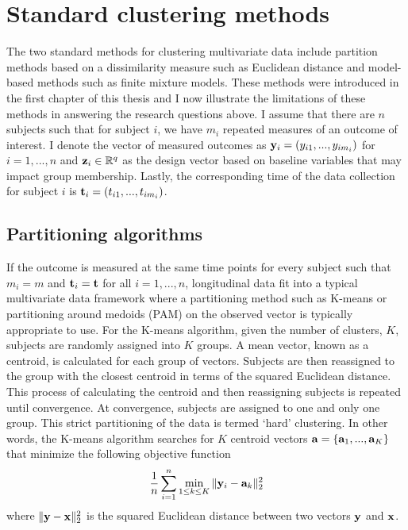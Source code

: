 \section{Standard clustering methods}
The two standard methods for clustering multivariate data include partition methods based on a dissimilarity measure such as Euclidean distance and model-based methods such as finite mixture models. These methods were introduced in the first chapter of this thesis and I now illustrate the limitations of these methods in answering the research questions above. I assume that there are $n$ subjects such that for subject $i$, we have $m_{i}$ repeated measures of an outcome of interest. I denote the vector of measured outcomes as $\mathbf y_{i}=(y_{i1},...,y_{im_{i}})$ for $i=1,...,n$ and $\mathbf z_{i}\in \mathbb{R}^{q}$ as the design vector based on baseline variables that may impact group membership. Lastly, the corresponding time of the data collection for subject $i$ is $\mathbf t_{i}=(t_{i1},...,t_{im_{i}})$. 
\subsection{Partitioning algorithms}
If the outcome is measured at the same time points for every subject such that $m_{i}=m$ and $\mathbf t_{i}=\mathbf t$ for all $i=1,...,n$, longitudinal data fit into a typical multivariate data framework where a partitioning method such as K-means \cite{macqueen1967, hartigan1979} or partitioning around medoids (PAM) \cite{kaufman1990} on the observed vector is typically appropriate to use. For the K-means algorithm, given the number of clusters, $K$, subjects are randomly assigned into $K$ groups. A mean vector, known as a centroid, is calculated for each group of vectors. Subjects are then reassigned to the group with the closest centroid in terms of the squared Euclidean distance. This process of calculating the centroid and then reassigning subjects is repeated until convergence. At convergence, subjects are assigned to one and only one group. This strict partitioning of the data is termed `hard' clustering. In other words, the K-means algorithm searches for $K$ centroid vectors $\mathbf a=\{\mathbf a_{1}, ...,\mathbf a_{K}\}$ that minimize the following objective function
$$\frac{1}{n} \sum^{n}_{i=1}\min_{1\leq k\leq K}\|\mathbf  y_{i}-\mathbf a_{k}\|_{2}^{2}$$
where $\|\mathbf y - \mathbf x\|^{2}_{2}$ is the squared Euclidean distance between two vectors $\mathbf y$ and $\mathbf x$.\\

